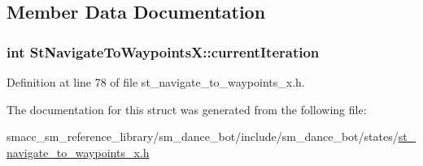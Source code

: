 \subsection{Member Data Documentation}
\subsubsection[{\texorpdfstring{current\+Iteration}{currentIteration}}]{\setlength{\rightskip}{0pt plus 5cm}int St\+Navigate\+To\+Waypoints\+X\+::current\+Iteration}\hypertarget{structStNavigateToWaypointsX_a2f597fd0ee0258ef66506e98d55e8060}{}\label{structStNavigateToWaypointsX_a2f597fd0ee0258ef66506e98d55e8060}


Definition at line 78 of file st\+\_\+navigate\+\_\+to\+\_\+waypoints\+\_\+x.\+h.



The documentation for this struct was generated from the following file\+:\begin{DoxyCompactItemize}
\item 
smacc\+\_\+sm\+\_\+reference\+\_\+library/sm\+\_\+dance\+\_\+bot/include/sm\+\_\+dance\+\_\+bot/states/\hyperlink{st__navigate__to__waypoints__x_8h}{st\+\_\+navigate\+\_\+to\+\_\+waypoints\+\_\+x.\+h}\end{DoxyCompactItemize}
